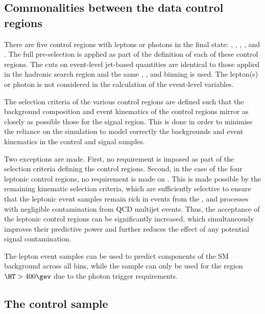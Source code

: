 \subsection{Commonalities between the data control regions}

There are five control regions with leptons or photons in the final
state: \mj, \mmj, \ej, \eej, and \gj. The full pre-selection is
applied as part of the definition of each of these control
regions. The cuts on event-level jet-based quantities are identical to
those applied in the hadronic search region and the same \njet, \nb,
and \scalht binning is used. The lepton(s) or photon is not considered
in the calculation of the event-level variables.

The selection criteria of the various control regions are defined such
that the background composition and event kinematics of the control
regions mirror as closely as possible those for the signal
region. This is done in order to minimise the reliance on the
simulation to model correctly the backgrounds and event kinematics in
the control and signal samples.

Two exceptions are made. First, no \bdphi requirement is imposed as
part of the selection criteria defining the control regions. Second,
in the case of the four leptonic control regions, no requirement is
made on \alphat. This is made possible by the remaining kinematic
selection criteria, which are sufficiently selective to ensure that
the leptonic event samples remain rich in events from the \wj, \ttbar
and \zll processes with negligible contamination from QCD multijet
events. Thus, the acceptance of the leptonic control regions can be
significantly increased, which simultaneously improves their
predictive power and further reduces the effect of any potential
signal contamination.

The lepton event samples can be used to predict components of the SM
background across all \scalht bins, while the \gj sample can only be
used for the region $\HT > 400\gev$ due to the photon trigger
requirements.

\subsection{The \texorpdfstring{\mj}{muon plus jets} control sample}
\label{subsec:mucontrolSelection}


